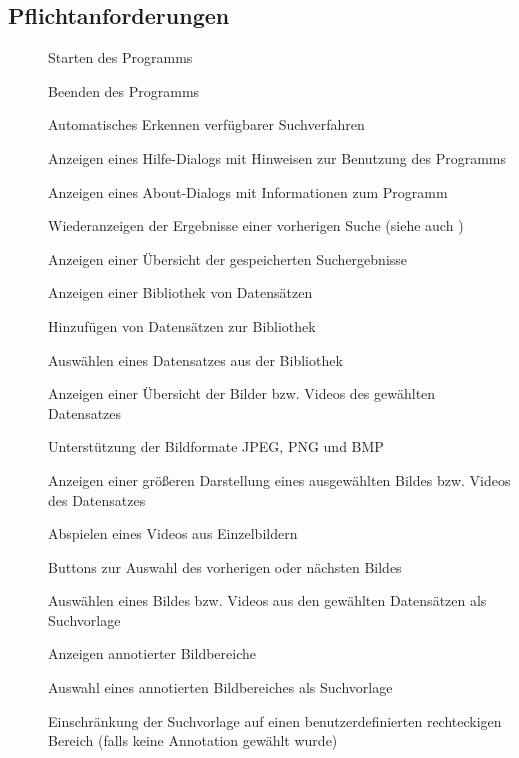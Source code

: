 \subsection{Pflichtanforderungen}
\begin{description}
	\item[] Starten des Programms
	\item[] Beenden des Programms
	\item[] Automatisches Erkennen verfügbarer Suchverfahren
	\item[] Anzeigen eines Hilfe-Dialogs mit Hinweisen zur Benutzung des Programms
	\item[] Anzeigen eines About-Dialogs mit Informationen zum Programm
	\newline
	\item[] Wiederanzeigen der Ergebnisse einer vorherigen Suche (siehe auch )
	\item[] Anzeigen einer Übersicht der gespeicherten Suchergebnisse
	\item[] Anzeigen einer Bibliothek von Datensätzen
	\item[] Hinzufügen von Datensätzen zur Bibliothek
	\item[] Ausw\"ahlen eines Datensatzes aus der Bibliothek
	\item[] Anzeigen einer Übersicht der Bilder bzw. Videos des gewählten Datensatzes
	\item[] Unterstützung der Bildformate JPEG, PNG und BMP
	\item[] Anzeigen einer größeren Darstellung eines ausgewählten Bildes bzw. Videos des Datensatzes
	\item[] Abspielen eines Videos aus Einzelbildern
	\item[] Buttons zur Auswahl des vorherigen oder nächsten Bildes
	\item[] Ausw\"ahlen eines Bildes bzw. Videos aus den gewählten Datensätzen als Suchvorlage
	\item[] Anzeigen annotierter Bildbereiche
	\item[] Auswahl eines annotierten Bildbereiches als Suchvorlage
	\item[] Einschränkung der Suchvorlage auf einen benutzerdefinierten rechteckigen Bereich (falls keine Annotation gewählt wurde)

\end{description}
